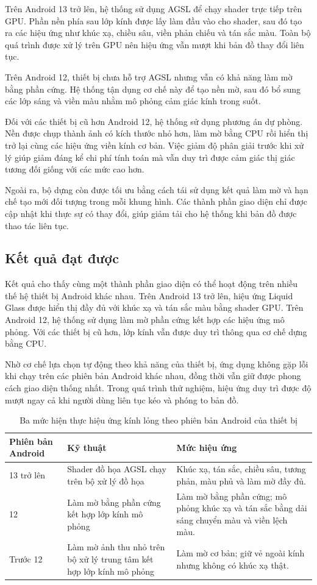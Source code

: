 \documentclass[../DoAn.tex]{subfiles}
\begin{document}
Trên Android 13 trở lên, hệ thống sử dụng AGSL để chạy shader trực tiếp trên GPU. Phần nền phía sau lớp kính được lấy làm đầu vào cho shader, sau đó tạo ra các hiệu ứng như khúc xạ, chiều sâu, viền phản chiếu và tán sắc màu. Toàn bộ quá trình được xử lý trên GPU nên hiệu ứng vẫn mượt khi bản đồ thay đổi liên tục.

Trên Android 12, thiết bị chưa hỗ trợ AGSL nhưng vẫn có khả năng làm mờ bằng phần cứng. Hệ thống tận dụng cơ chế này để tạo nền mờ, sau đó bổ sung các lớp sáng và viền màu nhằm mô phỏng cảm giác kính trong suốt.

Đối với các thiết bị cũ hơn Android 12, hệ thống sử dụng phương án dự phòng. Nền được chụp thành ảnh có kích thước nhỏ hơn, làm mờ bằng CPU rồi hiển thị trở lại cùng các hiệu ứng viền kính cơ bản. Việc giảm độ phân giải trước khi xử lý giúp giảm đáng kể chi phí tính toán mà vẫn duy trì được cảm giác thị giác tương đối giống với các mức cao hơn.

Ngoài ra, bộ dựng còn được tối ưu bằng cách tái sử dụng kết quả làm mờ và hạn chế tạo mới đối tượng trong mỗi khung hình. Các thành phần giao diện chỉ được cập nhật khi thực sự có thay đổi, giúp giảm tải cho hệ thống khi bản đồ được thao tác liên tục.

\subsection{Kết quả đạt được}
Kết quả cho thấy cùng một thành phần giao diện có thể hoạt động trên nhiều thế hệ thiết bị Android khác nhau. Trên Android 13 trở lên, hiệu ứng Liquid Glass được hiển thị đầy đủ với khúc xạ và tán sắc màu bằng shader GPU. Trên Android 12, hệ thống sử dụng làm mờ phần cứng kết hợp các hiệu ứng mô phỏng. Với các thiết bị cũ hơn, lớp kính vẫn được duy trì thông qua cơ chế dựng bằng CPU.

Nhờ cơ chế lựa chọn tự động theo khả năng của thiết bị, ứng dụng không gặp lỗi khi chạy trên các phiên bản Android khác nhau, đồng thời vẫn giữ được phong cách giao diện thống nhất. Trong quá trình thử nghiệm, hiệu ứng duy trì được độ mượt ngay cả khi người dùng liên tục kéo và phóng to bản đồ.

\begin{table}[H]
\centering
\begin{tabular}{|p{2.7cm}|p{4.0cm}|p{6.2cm}|}
\hline
\textbf{Phiên bản Android} & \textbf{Kỹ thuật} & \textbf{Mức hiệu ứng} \\ \hline
13 trở lên & Shader đồ họa AGSL chạy trên bộ xử lý đồ họa & Khúc xạ, tán sắc, chiều sâu, tương phản, màu phủ và làm mờ đầy đủ. \\ \hline
12 & Làm mờ bằng phần cứng kết hợp lớp kính mô phỏng & Làm mờ bằng phần cứng; mô phỏng khúc xạ và tán sắc bằng dải sáng chuyển màu và viền lệch màu. \\ \hline
Trước 12 & Làm mờ ảnh thu nhỏ trên bộ xử lý trung tâm kết hợp lớp kính mô phỏng & Làm mờ cơ bản; giữ vẻ ngoài kính nhưng không có khúc xạ thật. \\ \hline
\end{tabular}
\caption{Ba mức hiện thực hiệu ứng kính lỏng theo phiên bản Android của thiết bị}
\label{table:liquidglass-tiers}
\end{table}
\end{document}
